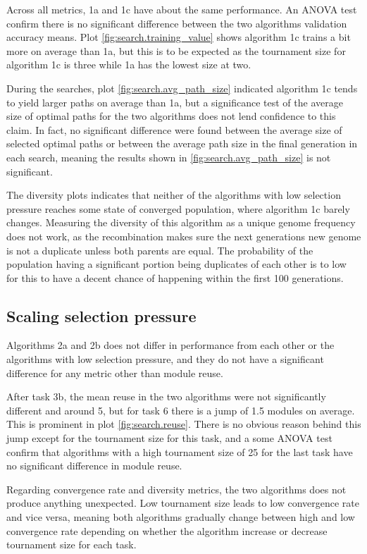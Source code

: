 Across all metrics, 1a and 1c have about the same performance. An ANOVA test confirm there is no significant difference between the two algorithms validation accuracy means. Plot \ref{fig:search.training_value} shows algorithm 1c trains a bit more on average than 1a, but this is to be expected as the tournament size for algorithm 1c is three while 1a has the lowest size at two. 

During the searches, plot \ref{fig:search.avg_path_size} indicated algorithm 1c tends to yield larger paths on average than 1a, but a significance test of the average size of optimal paths for the two algorithms does not lend confidence to this claim. In fact, no significant difference were found between the average size of selected optimal paths or between the average path size in the final generation in each search, meaning the results shown in \ref{fig:search.avg_path_size} is not significant.

The diversity plots indicates that neither of the algorithms with low selection pressure reaches some state of converged population, where algorithm 1c barely changes. Measuring the diversity of this algorithm as a unique genome frequency does not work, as the recombination makes sure the next generations new genome is not a duplicate unless both parents are equal. The probability of the population having a significant portion being duplicates of each other is to low for this to have a decent chance of happening within the first 100 generations. 

\subsection{Scaling selection pressure}
Algorithms 2a and 2b does not differ in performance from each other or the algorithms with low selection pressure, and they do not have a significant difference for any metric other than module reuse. 

After task 3b, the mean reuse in the two algorithms were not significantly different and around 5, but for task 6 there is a jump of 1.5 modules on average. This is prominent in plot \ref{fig:search.reuse}. There is no obvious reason behind this jump except for the tournament size for this task, and a some ANOVA test confirm that algorithms with a high tournament size of 25 for the last task have no significant difference in module reuse.  

Regarding convergence rate and diversity metrics, the two algorithms does not produce anything unexpected. Low tournament size leads to low convergence rate and vice versa, meaning both algorithms gradually change between high and low convergence rate depending on whether the algorithm increase or decrease tournament size for each task.

